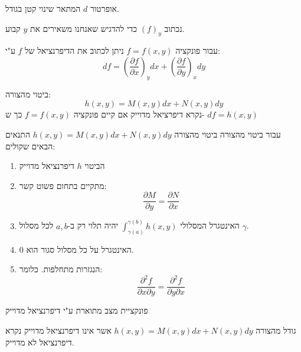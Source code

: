 \documentclass{tstextbook}
\begin{document}
\begin{definition}[דיפרנציאל]
אופרטור \(d\) המתאר שינוי קטן בגודל.

\end{definition}
\begin{symbolize}
נכתוב \((f)_{y}\) כדי להדגיש שאנחנו משאירים את \(y\) קבוע.

\end{symbolize}
\begin{proposition}
עבור פונקציה \(f=f(x,y)\) ניתן לכתוב את הדיפרנציאל של \(f\) ע"י:
$$d\!f=\left({\frac{\partial f}{\partial x}}\right)_{y}d x+\left({\frac{\partial f}{\partial y}}\right)_{x}d y$$

\end{proposition}
\begin{definition}
ביטוי מהצורה:
$$h(x,y)=M(x,y)dx+N(x,y)dy$$
נקרא דיפרציאל מדוייק אם קיים פונקציה \(f=f(x,y)\) כך ש- \(df=h(x,y)\)

\end{definition}
\begin{proposition}
עבור ביטוי מהצורה ביטוי מהצורה \(h(x,y)=M(x,y)dx+N(x,y)dy\) התנאים הבאים שקולים:

  \begin{enumerate}
    \item הביטוי \(h\) דיפרנציאל מדוייק 


    \item מתקיים בתחום פשוט קשר: 
$$\frac{\partial M}{\partial y} =\frac{\partial N}{\partial x} $$


    \item האינטגרל המסלולי \(\int_{\gamma(a)}^{\gamma(b)}h(x,y)\) יהיה תלוי רק ב-\(a,b\) לכל מסלול \(\gamma\). 


    \item האינטגרל על כל מסלול סגור הוא 0. 


    \item הנגזרות מתחלפות. כלומר: 
$$\frac{\partial^2 f}{\partial x\partial y}=\frac{\partial ^2f}{\partial y\partial x}  $$


  \end{enumerate}
\end{proposition}
\begin{corollary}
פונקציית מצב מתוארת ע"י דיפרנציאל מדוייק

\end{corollary}
\begin{definition}
גודל מהצורה \(h(x,y)=M(x,y)dx+N(x,y)dy\) אשר אינו דיפרנציאל מדוייק נקרא דיפרנציאל לא מדוייק.

\end{definition}
\end{document}
